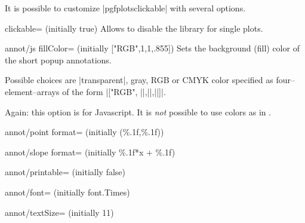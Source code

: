 It is possible to customize |pgfplotsclickable| with several options.

\begin{pgfplotskey}{clickable= (initially true)}
	Allows to disable the library for single plots.
\end{pgfplotskey}

\begin{pgfplotskey}{annot/js fillColor= (initially ["RGB",1,1,.855])}
	Sets the background (fill) color of the short popup annotations. 
	
	Possible choices are |transparent|, gray, RGB or CMYK color specified as four--element--arrays of the form
	|["RGB", ||,||,||]|.

	Again: this option is for Javascript. It is \emph{not} possible to use colors as in \pgfname.
\end{pgfplotskey}

\begin{pgfplotskey}{annot/point format= (initially {(\%.1f,\%.1f)})}
\end{pgfplotskey}

\begin{pgfplotskey}{annot/slope format= (initially \%.1f*x + \%.1f)}
\end{pgfplotskey}

\begin{pgfplotskey}{annot/printable= (initially false)}
	
\end{pgfplotskey}

\begin{pgfplotskey}{annot/font= (initially font.Times)}
	
\end{pgfplotskey}

\begin{pgfplotskey}{annot/textSize= (initially 11)}
	
\end{pgfplotskey}
